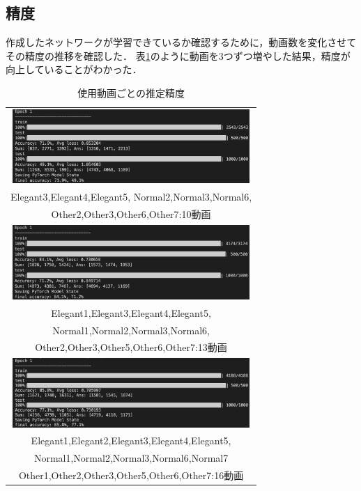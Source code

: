 \subsection{精度}
作成したネットワークが学習できているか確認するために，動画数を変化させて
その精度の推移を確認した．
表\ref{result}のように動画を3つずつ増やした結果，精度が向上していることがわかった．

\begin{table}[b]
  \begin{center}
    \begin{tabular}{c}
        \includegraphics[width=90mm]{images/net_result/result10.png}
      \\
        Elegant3\cite{ballet},Elegant4\cite{thai},Elegant5\cite{jpn2},
        Normal2\cite{kadokawa},Normal3\cite{bts},Normal6\cite{manolo},
      \\
        Other2\cite{posing},Other3\cite{boxing},Other6\cite{shinkokyu},Other7\cite{leaves}:10動画
      \\
        \includegraphics[width=90mm]{images/net_result/result13.png}
      \\
        Elegant1\cite{jpn},Elegant3\cite{ballet},Elegant4\cite{thai},Elegant5\cite{jpn2},
      \\
        Normal1\cite{ariana},Normal2\cite{kadokawa},Normal3\cite{bts},Normal6\cite{manolo},
      \\
        Other2\cite{posing},Other3\cite{boxing},Other5\cite{running},Other6\cite{shinkokyu},Other7\cite{leaves}:13動画
      \\
        \includegraphics[width=90mm]{images/net_result/result16.png}
      \\
        Elegant1\cite{jpn},Elegant2\cite{china},Elegant3\cite{ballet},Elegant4\cite{thai},Elegant5\cite{jpn2},
      \\
        Normal1\cite{ariana},Normal2\cite{kadokawa},Normal3\cite{bts},Normal6\cite{manolo},Normal7\cite{aito}
      \\
        Other1\cite{radio},Other2\cite{posing},Other3\cite{boxing},Other5\cite{running},Other6\cite{shinkokyu},Other7\cite{leaves}:16動画
      \\
    \end{tabular}
  \end{center}
  \caption{使用動画ごとの推定精度}
  \label{result}
\end{table}
